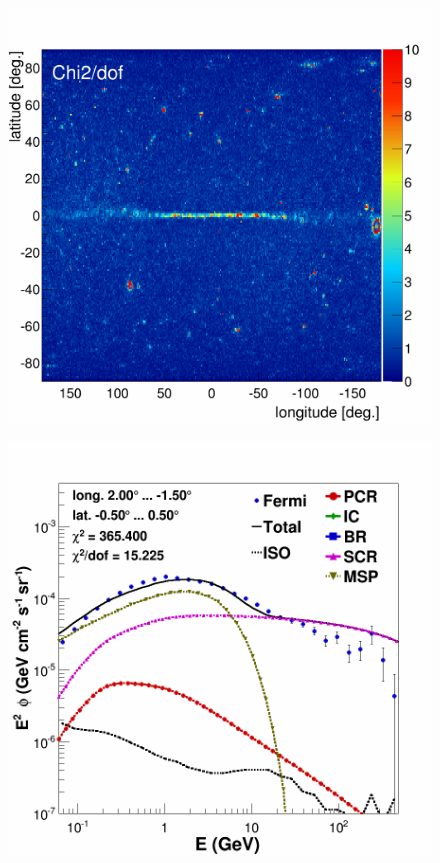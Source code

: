 \begin{figure}[H]
\begin{minipage}[h]{0.45\textwidth}
  	\subcaption{}
  	\label{fig:DMonly_CMZ}
  \end{minipage}
  \hfill
  \begin{minipage}[h]{0.45\textwidth}
  	\centering
	\includegraphics[width=1\linewidth]{./pic/results/MSPonly_fine_chi2_distribution.png}
  	\subcaption{}
  \label{fig:MSPonly_chi2Distribution}
  \end{minipage}
  \hfill
  \begin{minipage}[h]{0.45\textwidth}
  	\centering
	\includegraphics[width=1\linewidth]{pic/results/MSPonly_CMZ.png}

\end{minipage}
\end{figure}
